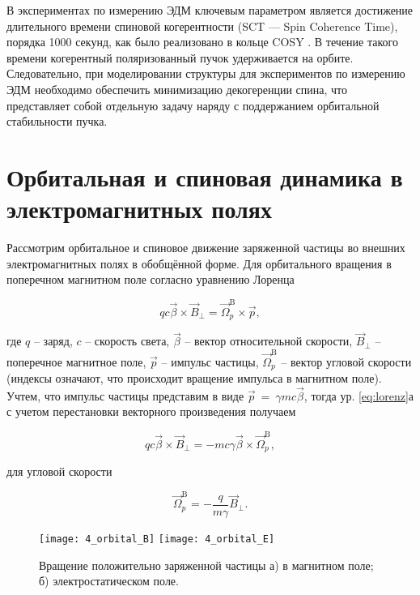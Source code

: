 \par В экспериментах по измерению ЭДМ ключевым параметром является достижение длительного времени спиновой когерентности (SCT — Spin Coherence Time), порядка 1000 секунд, как было реализовано в кольце COSY \cite{AGSproposal}. В течение такого времени когерентный поляризованный пучок удерживается на орбите. Следовательно, при моделировании структуры для экспериментов по измерению ЭДМ необходимо обеспечить минимизацию декогеренции спина, что представляет собой отдельную задачу наряду с поддержанием орбитальной стабильности пучка.

\section{Орбитальная и спиновая динамика в электромагнитных полях}\label{sec:EDM/requirements/deflector}

\par Рассмотрим орбитальное и спиновое движение заряженной частицы во внешних электромагнитных полях в обобщённой форме. Для орбитального вращения в поперечном магнитном поле согласно уравнению Лоренца

\begin{equation} 
qc\vec{\beta}\times{\vec{B}}_\bot={\vec{\Omega}}_p^{\textrm{B}}\times\vec{p},
\label{eq:lorenz}
\end{equation}

\noindent где $q$ -- заряд, $c$ -- скорость света, $\vec{\beta}$ -- вектор относительной скорости, ${\vec{B}}_\bot$ -- поперечное магнитное поле, $\vec{p}$ -- импульс частицы, ${\vec{\Omega}}_p^{\textrm{B}}$ -- вектор угловой скорости (индексы означают, что происходит вращение импульса в магнитном поле). Учтем, что импульс частицы представим в виде $\vec{p}\ =\ \gamma mc\vec{\beta}$, тогда ур. \ref{eq:lorenz}а с учетом перестановки векторного произведения получаем

\begin{equation}	
qc\vec{\beta}\times{\vec{B}}_\bot=-mc\gamma\vec{\beta}\times{\vec{\Omega}}_p^{\textrm{B}},
\end{equation}

\noindent для угловой скорости

\begin{equation} \label{eq:omega_pB}
 {\vec{\Omega}}_p^{\textrm{B}}=-\frac{q}{m\gamma}{\vec{B}}_\bot.
\end{equation} 

\begin{figure}[!h]
  \centering
	\texttt{[image: 4\_orbital\_B]}
	\texttt{[image: 4\_orbital\_E]}
   \caption{Вращение положительно заряженной частицы а) в магнитном поле; б) электростатическом поле.}
   \label{fig:4_orbital_B_E}
\end{figure}

